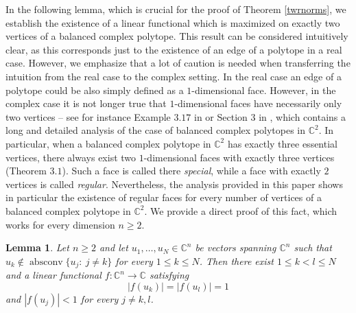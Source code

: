 \documentclass[12pt, reqno]{amsart}
\newtheorem{lem}[twr]{Lemma}
\theoremstyle{definition}
\theoremstyle{remark}
\numberwithin{equation}{section}
\DeclareMathOperator{\absconv}{absconv}
\begin{document}
In the following lemma, which is crucial for the proof of Theorem \ref{twrnorms}, we establish the existence of a linear functional which is maximized on exactly two vertices of a balanced complex polytope. This result can be considered intuitively clear, as this corresponds just to the existence of an edge of a polytope in a real case. However, we emphasize that a lot of caution is needed when transferring the intuition from the real case to the complex setting. In the real case an edge of a polytope could be also simply defined as a $1$-dimensional face. However, in the complex case it is not longer true that $1$-dimensional faces have necessarily only two vertices -- see for instance Example $3.17$ in \cite{complexpolytope} or Section $3$ in \cite{complexpolytope2dim}, which contains a long and detailed analysis of the case of balanced complex polytopes in $\mathbb{C}^2$. In particular, when a balanced complex polytope in $\mathbb{C}^2$ has exactly three essential vertices, there always exist two $1$-dimensional faces with exactly three vertices (Theorem $3.1$). Such a face is called there \emph{special}, while a face with exactly $2$ vertices is called \emph{regular}. Nevertheless, the analysis provided in this paper shows in particular the existence of regular faces for every number of vertices of a balanced complex polytope in $\mathbb{C}^2$. We provide a direct proof of this fact, which works for every dimension $n \geq 2$.

\begin{lem}
\label{lemface}
Let $n \geq 2$ and let $u_1, \ldots, u_N \in \mathbb{C}^n$ be vectors spanning $\mathbb{C}^n$ such that $u_k \not \in \absconv\{u_j: \ j \neq k\}$ for every $1 \leq k \leq N$. Then there exist $1 \leq k < l \leq N$ and a linear functional $f: \mathbb{C}^n \to \mathbb{C}$ satisfying
$$|f(u_k)|=|f(u_l)|=1$$
and $|f(u_j)|<1$ for every $j \neq k, l$.
\end{lem}
\end{document}
